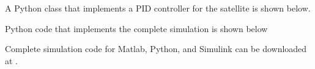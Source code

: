 A Python class that implements a PID controller for the satellite is shown below.


Python code that implements the complete simulation is shown below


Complete simulation code for Matlab, Python, and Simulink can be downloaded at .


%


